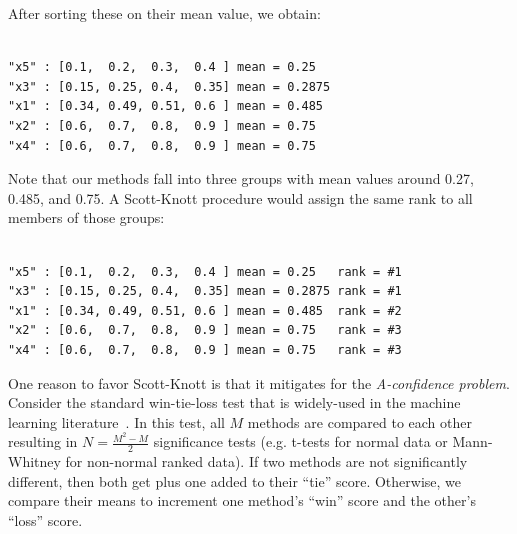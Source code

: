 \documentclass{sig-alternate}
\begin{document}
\noindent
After sorting these on their mean value, we obtain:

\begin{minipage}{0.7\linewidth}
\scriptsize
\begin{verbatim}

"x5" : [0.1,  0.2,  0.3,  0.4 ] mean = 0.25
"x3" : [0.15, 0.25, 0.4,  0.35] mean = 0.2875
"x1" : [0.34, 0.49, 0.51, 0.6 ] mean = 0.485
"x2" : [0.6,  0.7,  0.8,  0.9 ] mean = 0.75
"x4" : [0.6,  0.7,  0.8,  0.9 ] mean = 0.75

\end{verbatim}
\end{minipage}

\noindent
Note that our methods fall into three groups with mean values around
0.27, 0.485, and 0.75. A Scott-Knott procedure would assign the same rank
to all members of those groups:

\begin{minipage}{0.7\linewidth}
\scriptsize
\begin{verbatim}

"x5" : [0.1,  0.2,  0.3,  0.4 ] mean = 0.25   rank = #1
"x3" : [0.15, 0.25, 0.4,  0.35] mean = 0.2875 rank = #1
"x1" : [0.34, 0.49, 0.51, 0.6 ] mean = 0.485  rank = #2
"x2" : [0.6,  0.7,  0.8,  0.9 ] mean = 0.75   rank = #3
"x4" : [0.6,  0.7,  0.8,  0.9 ] mean = 0.75   rank = #3

\end{verbatim}
\end{minipage}

One reason to favor Scott-Knott is that it mitigates for the {\em
  A-confidence problem}. Consider the standard win-tie-loss test that
is widely-used in the machine learning
literature~\cite{demsar06,Witten05}.  In this test, all $M$ methods
are compared to each other resulting in $N=\frac{M^2-M}{2}$
significance tests (e.g. t-tests for normal data or Mann-Whitney for
non-normal ranked data).  If two methods are not significantly
different, then both get plus one added to their ``tie'' score.
Otherwise, we compare their means to increment one method's
``win'' score and the other's ``loss'' score.
\end{document}
